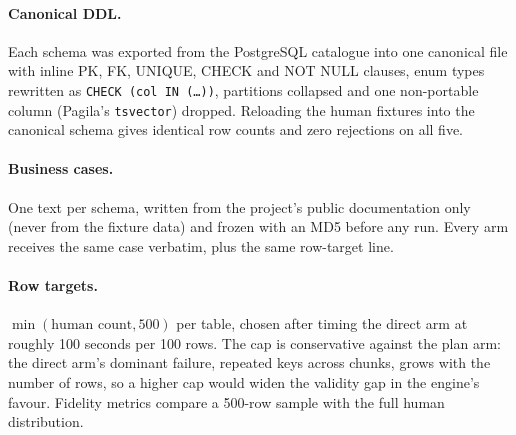 \documentclass[preprint,12pt]{elsarticle}
\begin{document}
\begin{table}[t]
\centering\footnotesize\setlength{\tabcolsep}{4pt}
\caption{E1 subjects. Human rows are the shipped fixture counts; row targets for the generated arms are $\min(\text{human}, 500)$ per table.}
\label{tab:subjects}
\end{table}

\paragraph{Canonical DDL.} Each schema was exported from the PostgreSQL catalogue into one canonical file with inline PK, FK, UNIQUE, CHECK and NOT NULL clauses, enum types rewritten as \texttt{CHECK (col IN (\ldots))}, partitions collapsed and one non-portable column (Pagila's \texttt{tsvector}) dropped. Reloading the human fixtures into the canonical schema gives identical row counts and zero rejections on all five.

\paragraph{Business cases.} One text per schema, written from the project's public documentation only (never from the fixture data) and frozen with an MD5 before any run. Every arm receives the same case verbatim, plus the same row-target line.

\paragraph{Row targets.} $\min(\text{human count}, 500)$ per table, chosen after timing the direct arm at roughly 100 seconds per 100 rows. The cap is conservative against the plan arm: the direct arm's dominant failure, repeated keys across chunks, grows with the number of rows, so a higher cap would widen the validity gap in the engine's favour. Fidelity metrics compare a 500-row sample with the full human distribution.
\end{document}
